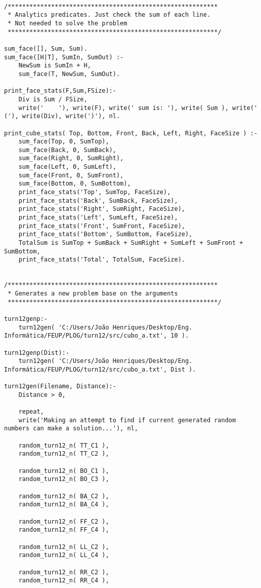 \begin{lstlisting}
	
/**********************************************************
 * Analytics predicates. Just check the sum of each line.
 * Not needed to solve the problem
 **********************************************************/
 
sum_face([], Sum, Sum).
sum_face([H|T], SumIn, SumOut) :-
	NewSum is SumIn + H,
	sum_face(T, NewSum, SumOut).
	
print_face_stats(F,Sum,FSize):-
	Div is Sum / FSize,
	write('    '), write(F), write(' sum is: '), write( Sum ), write(' ('), write(Div), write(')'), nl.
	
print_cube_stats( Top, Bottom, Front, Back, Left, Right, FaceSize ) :-
	sum_face(Top, 0, SumTop),
	sum_face(Back, 0, SumBack),
	sum_face(Right, 0, SumRight),
	sum_face(Left, 0, SumLeft),
	sum_face(Front, 0, SumFront),
	sum_face(Bottom, 0, SumBottom),
	print_face_stats('Top', SumTop, FaceSize),
	print_face_stats('Back', SumBack, FaceSize),
	print_face_stats('Right', SumRight, FaceSize),
	print_face_stats('Left', SumLeft, FaceSize),
	print_face_stats('Front', SumFront, FaceSize),
	print_face_stats('Bottom', SumBottom, FaceSize),
	TotalSum is SumTop + SumBack + SumRight + SumLeft + SumFront + SumBottom,
	print_face_stats('Total', TotalSum, FaceSize).
	
	
/**********************************************************
 * Generates a new problem base on the arguments
 **********************************************************/
 
turn12genp:-
	turn12gen( 'C:/Users/João Henriques/Desktop/Eng. Informática/FEUP/PLOG/turn12/src/cubo_a.txt', 10 ).
	
turn12genp(Dist):-
	turn12gen( 'C:/Users/João Henriques/Desktop/Eng. Informática/FEUP/PLOG/turn12/src/cubo_a.txt', Dist ).

turn12gen(Filename, Distance):-
	Distance > 0,
	
	repeat,
	write('Making an attempt to find if current generated random numbers can make a solution...'), nl,
	
	random_turn12_n( TT_C1 ),
	random_turn12_n( TT_C2 ),

	random_turn12_n( BO_C1 ),
	random_turn12_n( BO_C3 ),

	random_turn12_n( BA_C2 ),
	random_turn12_n( BA_C4 ),
	
	random_turn12_n( FF_C2 ),
	random_turn12_n( FF_C4 ),
	
	random_turn12_n( LL_C2 ),
	random_turn12_n( LL_C4 ),
	
	random_turn12_n( RR_C2 ),
	random_turn12_n( RR_C4 ),


\end{lstlisting}
